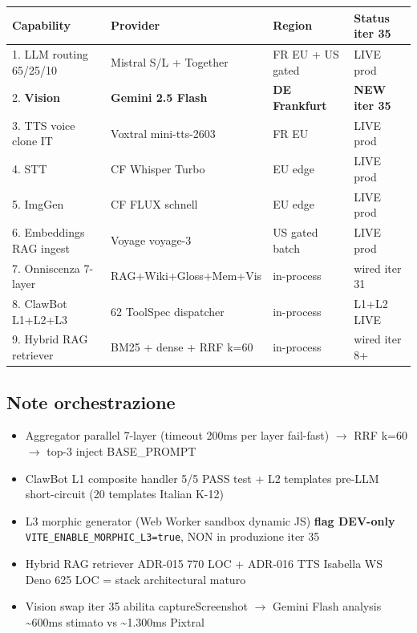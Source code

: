\documentclass[12pt,a4paper]{article}
\begin{document}
\begin{center}
\begin{tabular}{llll}
\toprule
\textbf{Capability} & \textbf{Provider} & \textbf{Region} & \textbf{Status iter 35} \\
\midrule
1. LLM routing 65/25/10 & Mistral S/L + Together  & FR EU + US gated & LIVE prod \\
2. \textbf{Vision} & \textbf{Gemini 2.5 Flash} & \textbf{DE Frankfurt} & \textbf{NEW iter 35} \\
3. TTS voice clone IT     & Voxtral mini-tts-2603   & FR EU            & LIVE prod \\
4. STT                    & CF Whisper Turbo        & EU edge          & LIVE prod \\
5. ImgGen                 & CF FLUX schnell         & EU edge          & LIVE prod \\
6. Embeddings RAG ingest  & Voyage voyage-3         & US gated batch   & LIVE prod \\
7. Onniscenza 7-layer     & RAG+Wiki+Gloss+Mem+Vis  & in-process       & wired iter 31 \\
8. ClawBot L1+L2+L3       & 62 ToolSpec dispatcher  & in-process       & L1+L2 LIVE \\
9. Hybrid RAG retriever   & BM25 + dense + RRF k=60 & in-process       & wired iter 8+ \\
\bottomrule
\end{tabular}
\end{center}

\subsection*{Note orchestrazione}

\begin{itemize}[leftmargin=*]
  \item Aggregator parallel 7-layer (timeout 200ms per layer fail-fast) \(\rightarrow\) RRF k=60 \(\rightarrow\) top-3 inject BASE\_PROMPT
  \item ClawBot L1 composite handler 5/5 PASS test + L2 templates pre-LLM short-circuit (20 templates Italian K-12)
  \item L3 morphic generator (Web Worker sandbox dynamic JS) \textbf{flag DEV-only} \texttt{VITE\_ENABLE\_MORPHIC\_L3=true}, NON in produzione iter 35
  \item Hybrid RAG retriever ADR-015 770 LOC + ADR-016 TTS Isabella WS Deno 625 LOC = stack architectural maturo
  \item Vision swap iter 35 abilita captureScreenshot \(\rightarrow\) Gemini Flash analysis \textasciitilde 600ms stimato vs \textasciitilde 1.300ms Pixtral
\end{itemize}
\end{document}

